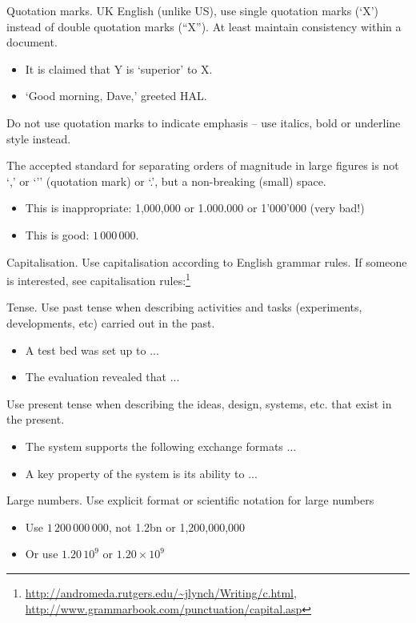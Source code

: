 Quotation marks. UK English (unlike US), use single quotation marks (‘X’) instead of double quotation marks (``X''). At least maintain consistency within a document. 

\begin{itemize}
    \item It is claimed that Y is ‘superior’ to X. 
    \item ‘Good morning, Dave,’ greeted HAL.
\end{itemize}

Do not use quotation marks to indicate emphasis – use italics, bold or underline style instead.

The accepted standard for separating orders of magnitude in large figures is not ‘,’ or ‘’’ (quotation mark) or ‘.’, but a non-breaking (small) space. 

\begin{itemize}
    \item This is inappropriate: 1,000,000 or 1.000.000 or 1’000’000 (very bad!) 
    \item This is good: $1\,000\,000$. 
\end{itemize}

Capitalisation. Use capitalisation according to English grammar rules. If someone is interested, see 
capitalisation rules:\footnote{\url{http://andromeda.rutgers.edu/~jlynch/Writing/c.html}, \url{http://www.grammarbook.com/punctuation/capital.asp}}

Tense. Use past tense when describing activities and tasks (experiments, developments, etc) carried out in the past. 

\begin{itemize}
    \item A test bed was set up to ...
    \item The evaluation revealed that ...
\end{itemize}

Use present tense when describing the ideas, design, systems, etc. that exist in the present. 

\begin{itemize}
    \item The system supports the following exchange formats ...
    \item A key property of the system is its ability to ...
\end{itemize}

Large numbers. Use explicit format or scientific notation for large numbers

\begin{itemize}
    \item Use $1\,200\,000\,000$, not 1.2bn or 1,200,000,000
    \item Or use $1.20\,10^9$ or $1.20 \times 10^9$
\end{itemize}

